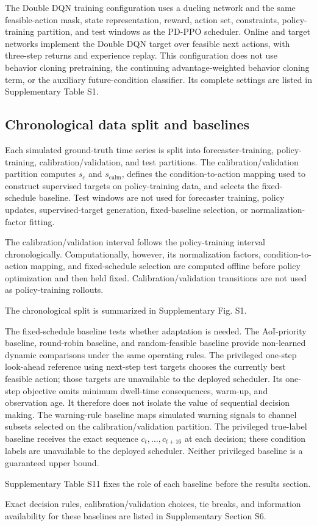 The Double DQN training configuration uses a dueling network and the same
feasible-action mask, state representation, reward, action set, constraints,
policy-training partition, and test windows as the PD-PPO scheduler. Online and
target networks implement the
Double DQN target over feasible next actions, with three-step returns and
experience replay. This configuration does not use behavior cloning pretraining, the continuing
advantage-weighted behavior cloning term, or the auxiliary future-condition
classifier. Its complete settings are listed in
Supplementary Table S1.

\subsection{Chronological data split and baselines}

Each simulated ground-truth time series is split into forecaster-training,
policy-training, calibration/validation, and test partitions. The
calibration/validation partition computes $s_c$ and $s_{\mathrm{calm}}$, defines
the condition-to-action mapping used to construct supervised targets on
policy-training data, and selects the fixed-schedule baseline. Test windows are
not used for forecaster training, policy updates,
supervised-target generation, fixed-baseline selection, or normalization-factor
fitting.

The calibration/validation interval follows the policy-training interval
chronologically. Computationally, however, its normalization factors,
condition-to-action mapping, and fixed-schedule selection are computed offline
before policy optimization and then held fixed. Calibration/validation
transitions are not used as policy-training rollouts.

The chronological split is summarized in Supplementary Fig. S1.

The fixed-schedule baseline tests whether adaptation is needed. The AoI-priority
baseline, round-robin baseline, and random-feasible baseline provide non-learned
dynamic comparisons under the same operating rules. The privileged one-step
look-ahead reference using next-step test targets chooses the currently best feasible action;
those targets are unavailable to the deployed scheduler. Its one-step objective omits
minimum dwell-time consequences, warm-up, and observation age. It therefore does not isolate the
value of sequential decision making. The warning-rule baseline maps simulated
warning signals to channel subsets selected on the calibration/validation
partition. The privileged true-label baseline receives the exact sequence
$c_t,\ldots,c_{t+16}$ at each decision; these condition labels are unavailable
to the deployed scheduler. Neither privileged baseline is a guaranteed upper
bound.

Supplementary Table S11 fixes the role of each baseline before the results
section.

Exact decision rules, calibration/validation choices, tie breaks, and information availability
for these baselines are listed in Supplementary Section S6.
